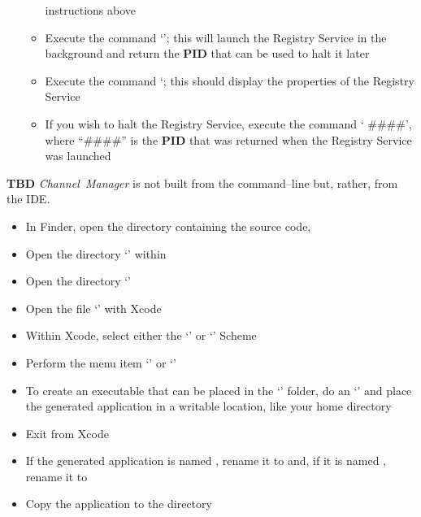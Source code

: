 \begin{itemize}
\begin{itemize}
instructions above
\item Execute the command `'; this will launch the Registry
Service in the background and return the \textbf{PID} that can be used to halt it later
\item Execute the command `; this should display the properties
of the Registry Service
\item If you wish to halt the Registry Service, execute the command `
\#\#\#\#', where ``\#\#\#\#'' is the \textbf{PID} that was returned when the Registry
Service was launched
\end{itemize}
\end{itemize}
\tertiaryEnd{}
\textbf{TBD}
\tertiaryEnd{}
\secondaryEnd{}
\textit{Channel~Manager} is not built from the command--line but, rather, from the IDE.
\begin{itemize}
\item In Finder, open the directory containing the \mplusm source code, 
\item Open the directory `' within
\item Open the directory `'
\item Open the file `' with Xcode
\item Within Xcode, select either the `' or
`' Scheme
\item Perform the menu item `' or
`'
\item To create an executable that can be placed in the `' folder,
do an `'
and place the generated application in a writable location, like your home directory
\item Exit from Xcode
\item If the generated application is named , rename it to
 and, if it is named , rename it
to 
\item Copy the  application to the 
directory
\end{itemize}

